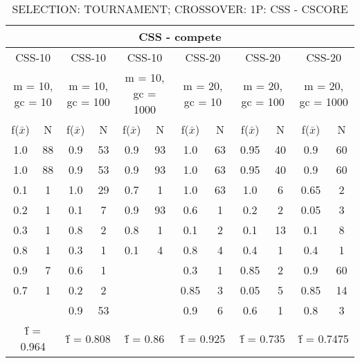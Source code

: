 \begin{table}[H]
	\centering
	\caption{SELECTION: TOURNAMENT; CROSSOVER: 1P: CSS - CSCORE}
	\begin{adjustbox}{width=1\textwidth}
		\begin{tabular}{ |c|c||c|c||c|c||c|c||c|c||c|c| }
			\hline
			\multicolumn{12}{|c|}{CSS - compete} \\
			\hline
			\multicolumn{2}{|c||}{CSS-10} & \multicolumn{2}{c||}{CSS-10} & \multicolumn{2}{c||}{CSS-10} & \multicolumn{2}{c||}{CSS-20} & \multicolumn{2}{c||}{CSS-20} & \multicolumn{2}{c|}{CSS-20}\\
			\hline
			\multicolumn{2}{|c||}{m = 10, gc = 10} & \multicolumn{2}{c||}{m = 10, gc = 100} & \multicolumn{2}{c||}{m = 10, gc = 1000} & \multicolumn{2}{c||}{m = 20, gc = 10} & \multicolumn{2}{c||}{m = 20, gc = 100} & \multicolumn{2}{c|}{m = 20, gc = 1000}\\
			\hline
			f($\bar{x}$) & N & f($\bar{x}$) & N & f($\bar{x}$) & N & f($\bar{x}$) & N & f($\bar{x}$) & N & f($\bar{x}$) & N\\
			\hline
			\hline
			1.0 & 88 & 0.9 & 53 & 0.9 & 93 & 1.0 & 63 & 0.95 & 40 & 0.9 & 60\\
			\hline
			1.0 & 88 & 0.9 & 53 & 0.9 & 93 & 1.0 & 63 & 0.95 & 40 & 0.9 & 60\\
			0.1 & 1 & 1.0 & 29 & 0.7 & 1 & 1.0 & 63 & 1.0 & 6 & 0.65 & 2\\
			0.2 & 1 & 0.1 & 7 & 0.9 & 93 & 0.6 & 1 & 0.2 & 2 & 0.05 & 3\\
			0.3 & 1 & 0.8 & 2 & 0.8 & 1 & 0.1 & 2 & 0.1 & 13 & 0.1 & 8\\
			0.8 & 1 & 0.3 & 1 & 0.1 & 4 & 0.8 & 4 & 0.4 & 1 & 0.4 & 1\\
			0.9 & 7 & 0.6 & 1 &   &   & 0.3 & 1 & 0.85 & 2 & 0.9 & 60\\
			0.7 & 1 & 0.2 & 2 &   &   & 0.85 & 3 & 0.05 & 5 & 0.85 & 14\\
			&   & 0.9 & 53 &   &   & 0.9 & 6 & 0.6 & 1 & 0.8 & 3\\
			\hline
			\multicolumn{2}{|c||}{\^{f} = 0.964} & \multicolumn{2}{c||}{\^{f} = 0.808} & \multicolumn{2}{c||}{\^{f} = 0.86} & \multicolumn{2}{c||}{\^{f} = 0.925} & \multicolumn{2}{c||}{\^{f} = 0.735} & \multicolumn{2}{c|}{\^{f} = 0.7475}\\
			\hline
		\end{tabular}
	\end{adjustbox}
	\label{tab-3p-res2}
\end{table}

